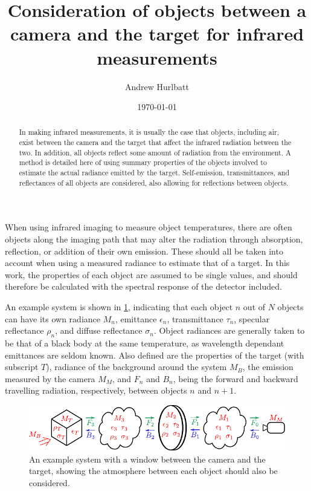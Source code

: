 \documentclass[11pt,a4paper]{article}
\title{Consideration of objects between a camera and the target for infrared measurements}
\author{Andrew Hurlbatt}
\date{\today}
\begin{document}
	
	\maketitle
	
	\begin{abstract}
		In making infrared measurements, it is usually the case that objects, including air, exist between the camera and the target that affect the infrared radiation between the two. In addition, all objects reflect some amount of radiation from the environment. A method is detailed here of using summary properties of the objects involved to estimate the actual radiance emitted by the target. Self-emission, transmittances, and reflectances of all objects are considered, also allowing for reflections between objects.
	\end{abstract}

When using infrared imaging to measure object temperatures, there are often objects along the imaging path that may alter the radiation through absorption, reflection, or addition of their own emission. These should all be taken into account when using a measured radiance to estimate that of a target. In this work, the properties of each object are assumed to be single values, and should therefore be calculated with the spectral response of the detector included. 

An example system is shown in \cref{fig:scheme}, indicating that each object $ n $ out of $ N $ objects can have its own radiance $ M_n $, emittance $ \epsilon_n $, transmittance $ \tau_n $, specular reflectance $ \rho_n $, and diffuse reflectance $ \sigma_n $. Object radiances are generally taken to be that of a black body at the same temperature, as wavelength dependant emittances are seldom known. Also defined are the properties of the target (with subscript $ T $), radiance of the background around the system $ M_B $, the emission measured by the camera $ M_M $, and $ F_n $ and $ B_n $, being the forward and backward travelling radiation, respectively, between objects $ n $ and $ n+1 $.

\begin{figure}
	\centering
	\includegraphics[width=\textwidth]{./infroptics_scheme.pdf}
	\caption{An example system with a window between the camera and the target, showing the atmosphere between each object should also be considered.}
	\label{fig:scheme}
\end{figure}
\end{document}

